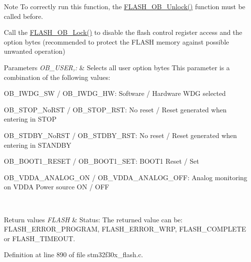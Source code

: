 \begin{DoxyNote}{Note}
To correctly run this function, the \hyperlink{group___f_l_a_s_h___group3_ga518d6e3bbba2adf1523e8454f62348e9}{F\-L\-A\-S\-H\-\_\-\-O\-B\-\_\-\-Unlock()} function must be called before. 

Call the \hyperlink{group___f_l_a_s_h___group3_ga63a33d9af7e29b64c3806e5505c59b74}{F\-L\-A\-S\-H\-\_\-\-O\-B\-\_\-\-Lock()} to disable the flash control register access and the option bytes (recommended to protect the F\-L\-A\-S\-H memory against possible unwanted operation) 
\end{DoxyNote}

\begin{DoxyParams}{Parameters}
{\em O\-B\-\_\-\-U\-S\-E\-R,\-:} & Selects all user option bytes This parameter is a combination of the following values\-: \begin{DoxyItemize}
\item O\-B\-\_\-\-I\-W\-D\-G\-\_\-\-S\-W / O\-B\-\_\-\-I\-W\-D\-G\-\_\-\-H\-W\-: Software / Hardware W\-D\-G selected \item O\-B\-\_\-\-S\-T\-O\-P\-\_\-\-No\-R\-S\-T / O\-B\-\_\-\-S\-T\-O\-P\-\_\-\-R\-S\-T\-: No reset / Reset generated when entering in S\-T\-O\-P \item O\-B\-\_\-\-S\-T\-D\-B\-Y\-\_\-\-No\-R\-S\-T / O\-B\-\_\-\-S\-T\-D\-B\-Y\-\_\-\-R\-S\-T\-: No reset / Reset generated when entering in S\-T\-A\-N\-D\-B\-Y \item O\-B\-\_\-\-B\-O\-O\-T1\-\_\-\-R\-E\-S\-E\-T / O\-B\-\_\-\-B\-O\-O\-T1\-\_\-\-S\-E\-T\-: B\-O\-O\-T1 Reset / Set \item O\-B\-\_\-\-V\-D\-D\-A\-\_\-\-A\-N\-A\-L\-O\-G\-\_\-\-O\-N / O\-B\-\_\-\-V\-D\-D\-A\-\_\-\-A\-N\-A\-L\-O\-G\-\_\-\-O\-F\-F\-: Analog monitoring on V\-D\-D\-A Power source O\-N / O\-F\-F \end{DoxyItemize}
\\
\hline
\end{DoxyParams}

\begin{DoxyRetVals}{Return values}
{\em F\-L\-A\-S\-H} & Status\-: The returned value can be\-: F\-L\-A\-S\-H\-\_\-\-E\-R\-R\-O\-R\-\_\-\-P\-R\-O\-G\-R\-A\-M, F\-L\-A\-S\-H\-\_\-\-E\-R\-R\-O\-R\-\_\-\-W\-R\-P, F\-L\-A\-S\-H\-\_\-\-C\-O\-M\-P\-L\-E\-T\-E or F\-L\-A\-S\-H\-\_\-\-T\-I\-M\-E\-O\-U\-T. \\
\hline
\end{DoxyRetVals}


Definition at line 890 of file stm32f30x\-\_\-flash.\-c.

